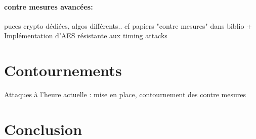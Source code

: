 \documentclass[a4paper,11pt]{article}
\begin{document}
\paragraph{contre mesures avancées:}  puces crypto dédiées, algos différents.. cf papiers "contre mesures" dans biblio + Implémentation d'AES résistante aux timing attacks~\cite{kasper2009faster} %

\section{Contournements}
Attaques à l'heure actuelle : mise en place, contournement des contre mesures %

\section*{Conclusion}

\newpage
\nocite{*}


\end{document}
